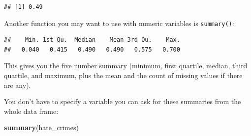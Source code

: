 \documentclass[]{book}
\newenvironment{Shaded}{\begin{snugshade}}{\end{snugshade}}
\newcommand{\KeywordTok}[1]{\textcolor[rgb]{0.13,0.29,0.53}{\textbf{#1}}}
\newcommand{\NormalTok}[1]{#1}
\newcommand{\OperatorTok}[1]{\textcolor[rgb]{0.81,0.36,0.00}{\textbf{#1}}}
\begin{document}
\begin{Shaded}
\end{Shaded}

\begin{verbatim}
## [1] 0.49
\end{verbatim}

Another function you may want to use with numeric variables is \texttt{summary()}:

\begin{Shaded}
\end{Shaded}

\begin{verbatim}
##    Min. 1st Qu.  Median    Mean 3rd Qu.    Max. 
##   0.040   0.415   0.490   0.490   0.575   0.700
\end{verbatim}

This gives you the five number summary (minimum, first quartile, median, third quartile, and maximum, plus the mean and the count of missing values if there are any).

You don't have to specify a variable you can ask for these summaries from the whole data frame:

\begin{Shaded}
\begin{Highlighting}[]
\KeywordTok{summary}\NormalTok{(hate_crimes)}
\end{Highlighting}
\end{Shaded}
\end{document}

